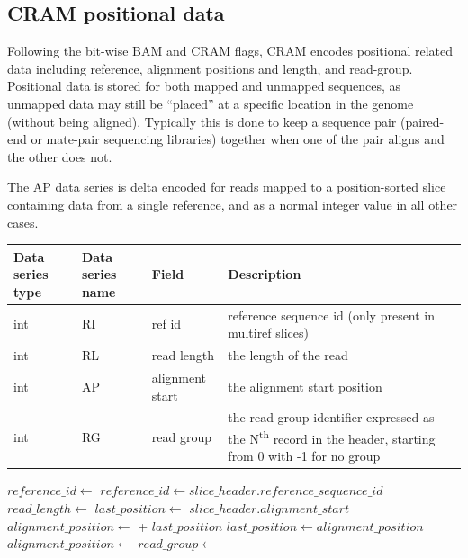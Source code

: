 \documentclass[a4paper]{article}
\begin{document}
\subsection{\textbf{CRAM positional data}}
\label{subsec:positions}

Following the bit-wise BAM and CRAM flags, CRAM encodes positional related data including reference, alignment positions and length, and read-group.
Positional data is stored for both mapped and unmapped sequences, as unmapped data may still be ``placed'' at a specific location in the genome (without being aligned).
Typically this is done to keep a sequence pair (paired-end or mate-pair sequencing libraries) together when one of the pair aligns and the other does not.

The AP data series is delta encoded for reads mapped to a position-sorted slice containing data from a single reference, and as a normal integer value in all other cases.

\begin{tabular}{|>{\raggedright}p{70pt}|>{\raggedright}p{75pt}|>{\raggedright}p{90pt}|>{\raggedright}p{171pt}|}
\hline
\textbf{Data series type} & \textbf{Data series name} & \textbf{Field} & \textbf{Description}\tabularnewline
\hline
int & RI & ref id & reference sequence id (only present in multiref slices)\tabularnewline
\hline
int & RL & read length & the length of the read\tabularnewline
\hline
int & AP & alignment start & the alignment start position\tabularnewline
\hline
int & RG & read group & the read group identifier expressed as the N\textsuperscript{th} record in the header, starting from 0 with -1 for no group\tabularnewline
\hline
\end{tabular}

\vskip 20pt
\begin{algorithmic}[1]
  \State $reference\_id\gets$ 
\Else
  \State $reference\_id\gets slice\_header.reference\_sequence\_id$
\EndIf
\State $read\_length \gets$ 
        \State $last\_position\gets$ $slice\_header.alignment\_start$
    \EndIf
    \State $alignment\_position \gets$  + $last\_position$
    \State $last\_position \gets alignment\_position$
\Else
    \State $alignment\_position \gets$ 
\EndIf
\State $read\_group \gets$ 
\EndProcedure
\end{algorithmic}
\end{document}
